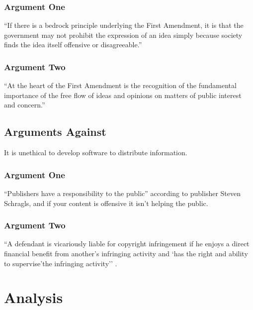 \documentclass[11pt]{article}
\begin{document}
\subsubsection{Argument One}
``If there is a bedrock principle underlying the First Amendment, it is that the government may not prohibit the expression of an idea simply because society finds the idea itself offensive or disagreeable.'' \cite[414]{1989texas}

\subsubsection{Argument Two}
``At the heart of the First Amendment is the recognition of the fundamental importance of the free flow of ideas and opinions on matters of public interest and concern.'' \cite[51]{1988hustler}

\subsection{Arguments Against}
It is unethical to develop software to distribute information.

\subsubsection{Argument One}

``Publishers have a responsibility to the public'' according to publisher Steven Schragls, and if your content is offensive it isn't helping the public. \cite[46]{hawker}

\subsubsection{Argument Two}

``A defendant is vicariously liable for copyright infringement if he enjoys a direct financial benefit from another's infringing activity and `has the right and ability to supervise'the infringing activity'' \cite{2000m}.

\section{Analysis}
\end{document}
